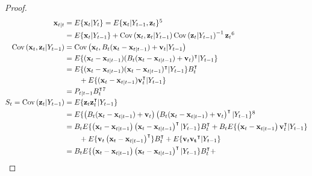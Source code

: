 \documentclass[12pt]{article}
\begin{document}
\begin{proof}
    \begin{align}
        \mathbf{x}_{t|t}&=E\{\mathbf{x}_t|Y_t\}=E\{\mathbf{x}_t|Y_{t-1},\mathbf{z}_t\}\footnotemark[5]\nonumber\\
                        &=E\{\mathbf{x}_t|Y_{t-1}\}+\text{Cov}\left(\mathbf{x}_t,\mathbf{z}_t|Y_{t-1}\right)\text{Cov}\left(\mathbf{z}_t|Y_{t-1}\right)^{-1}\mathbf{z}_t\footnotemark[6]\label{eq:xtGtTmp}\\
        \text{Cov}\left(\mathbf{x}_t,\mathbf{z}_t|Y_{t-1}\right)&=\text{Cov}\left(\mathbf{x}_t,B_t(\mathbf{x}_t-\mathbf{x}_{t|t-1})+\mathbf{v}_t|Y_{t-1}\right)\nonumber\\
                                                                &=E\{(\mathbf{x}_t-\mathbf{x}_{t|t-1})(B_t(\mathbf{x}_t-\mathbf{x}_{t|t-1})+\mathbf{v}_t)^\intercal|Y_{t-1}\}\nonumber\\
                                                                &=E\{(\mathbf{x}_t-\mathbf{x}_{t|t-1})(\mathbf{x}_t-\mathbf{x}_{t|t-1})^\intercal|Y_{t-1}\}B_t^\intercal\nonumber\\
                                                                &\qquad +E\{(\mathbf{x}_t-\mathbf{x}_{t|t-1})\mathbf{v}_t^\intercal|Y_{t-1}\}\nonumber\\
                                                                &=P_{t|t-1}B_t^\intercal\footnotemark[7]\label{eq:covXZ}\\
        S_t=\text{Cov}\left(\mathbf{z}_t|Y_{t-1}\right)&=E\{\mathbf{z}_t\mathbf{z}_t^\intercal|Y_{t-1}\}\nonumber\\
                                                       &=E\{\left(B_t(\mathbf{x}_t-\mathbf{x}_{t|t-1})+\mathbf{v}_t\right)\left(B_t(\mathbf{x}_t-\mathbf{x}_{t|t-1})+\mathbf{v}_t\right)^\intercal|Y_{t-1}\}\footnotemark[8]\nonumber\\
                                                       &=B_tE\{\left(\mathbf{x}_t-\mathbf{x}_{t|t-1}\right)\left(\mathbf{x}_t-\mathbf{x}_{t|t-1}\right)^\intercal|Y_{t-1}\}B_t^\intercal+B_tE\{\left(\mathbf{x}_t-\mathbf{x}_{t|t-1}\right)\mathbf{v}_t^\intercal|Y_{t-1}\}\nonumber\\
                                                       &\qquad +E\{\mathbf{v}_t\left(\mathbf{x}_t-\mathbf{x}_{t|t-1}\right)^\intercal\}B_t^\intercal+E\{\mathbf{v}_t\mathbf{v_t}^\intercal|Y_{t-1}\}\nonumber\\
                                                       &=B_tE\{\left(\mathbf{x}_t-\mathbf{x}_{t|t-1}\right)\left(\mathbf{x}_t-\mathbf{x}_{t|t-1}\right)^\intercal|Y_{t-1}\}B_t^\intercal+\nonumber\\

\end{align}
\end{proof}
\end{document}
